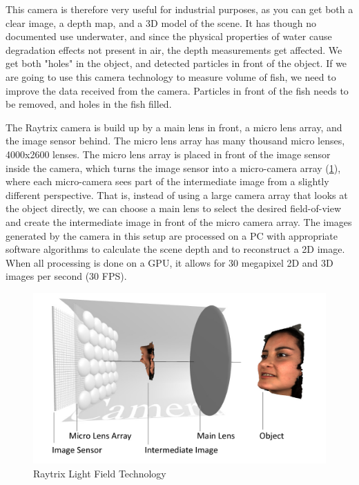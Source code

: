 This camera is therefore very useful for industrial purposes, as you can get both a clear image, a depth map, and a 3D model of the scene. It has though no documented use underwater, and since the physical properties of water cause degradation effects not present in air, the depth measurements get affected. We get both "holes" in the object, and detected particles in front of the object. If we are going to use this camera technology to measure volume of fish, we need to improve the data received from the camera. Particles in front of the fish needs to be removed, and holes in the fish filled.

The Raytrix camera is build up by a main lens in front, a micro lens array, and the image sensor behind. The micro lens array has many thousand micro lenses, 4000x2600 lenses. The micro lens array is placed in front of the image sensor inside the camera, which turns the image sensor into a micro-camera array (\ref{fig:light_field}), where each micro-camera sees part of the intermediate image from a slightly different perspective. That is, instead of using a large camera array that looks at the object directly, we can choose a main lens to select the desired field-of-view and create the intermediate image in front of the micro camera array. The images generated by the camera in this setup are processed on a PC with appropriate software algorithms to calculate the scene depth and to reconstruct a 2D image. When all processing is done on a GPU, it allows for 30 megapixel 2D and 3D images per second (30 FPS). \cite{website:raytrix_technology}

\begin{figure}[h]
    \centering
    \includegraphics[width=.9\linewidth]{images/introduction/Light-Field-Camera-Schematic}
    \caption{Raytrix Light Field Technology}
    \label{fig:light_field}
\end{figure}

